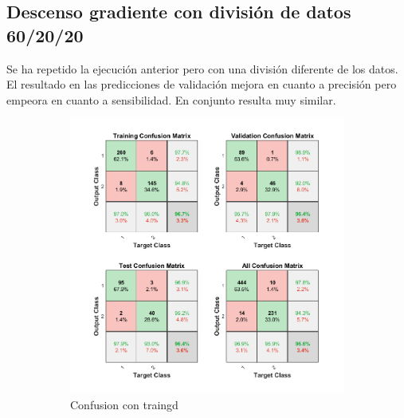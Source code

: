 \documentclass[a4paper, 12pt]{article}
\begin{document}
            \subsection{Descenso gradiente con división de datos 60/20/20}
                Se ha repetido la ejecución anterior pero con una división diferente de los datos. El resultado en las predicciones de validación mejora en cuanto a precisión pero empeora en cuanto a sensibilidad. En conjunto resulta muy similar.
                \begin{figure}[htp!]
                    \caption{Gráficas con Descenso gradiente con división 60/20/20}
                    \begin{subfigure}{0.49\textwidth}
                        \centering
        		      \includegraphics[width=\textwidth]{figures/parte1/Ej4/ej4_confusion_traingd_60.png}
                        \caption{Confusion con traingd}
                    \end{subfigure}
                    \begin{subfigure}{0.49\textwidth}

\end{subfigure}
\end{figure}
\end{document}
